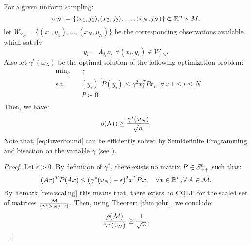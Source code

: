 \begin{theorem}\label{thm:lowerbound}
For a given uniform sampling: $$\omega_N := \{(x_1, j_1), (x_2, j_2), \ldots, (x_N, j_N)\} \subset \mathbb{R}^n \times M,$$ let $W_{\omega_N}=\{(x_1,y_1),...,(x_N,y_N)\}$ be the corresponding observations available, which satisfy $$y_i= A_{j_i}x_i\,\, \forall (x_i, y_i) \in W_{\omega_N}.$$
Also let $\gamma^*(\omega_N)$ be the optimal solution of the following optimization problem:
\begin{equation}\label{eq:lowerbound}
\begin{aligned}
& \text{min}_P & & \gamma \\
& \text{s.t.} 
&  & (y_i)^T P (y_i) \leq \gamma^2 x_i^TPx_i,\,  \forall \,i :1\leq i \leq N.\\
& && P \succ 0 \\
\end{aligned}
\end{equation}
Then, we have:
$$\rho(\mathcal{M}) \geq \frac{\gamma^*(\omega_N)}{\sqrt{n}}.$$ Note that, \eqref{eq:lowerbound} can be efficiently solved by Semidefinite Programming and bisection on the variable $\gamma$ (see \cite{boyd}).
\end{theorem}
\begin{proof}
Let $\epsilon >0$. By definition of $\gamma^*$,  there exists no matrix $P \in \mathcal{S}^n_{++}$ such that:
\begin{equation*}(Ax)^T P (Ax) \leq (\gamma^*(\omega_N) -\epsilon)^2x^TPx,\quad \forall x \in \mathbb{R}^n, \forall\, A \in \mathcal{M}.
\end{equation*}
By Remark \ref{rem:scaling} this means that, there exists no CQLF for the scaled set of matrices $\frac{\mathcal{M}}{(\gamma^*(\omega_N)-\epsilon)}$. Then, using Theorem \ref{thm:john}, we conclude:
\begin{equation*}\frac{\rho(\mathcal{M})}{\gamma^*(\omega_N)} \geq \frac{1}{\sqrt{n}}.\end{equation*}
\end{proof}
